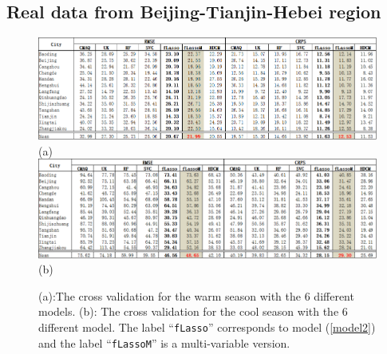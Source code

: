 \documentclass[
12pt, %
a4paper, %
oneside, %
headinclude,footinclude, %
BCOR5mm, %
]{scrartcl}
\begin{document}
\subsection{Real data from Beijing-Tianjin-Hebei region}
  \begin{figure}[H]
    \includegraphics[width= 16cm]{./Figures/fuse_lasso_s}\\
    (a)\\
     \includegraphics[width= 16cm]{./Figures/fuse_lasso_w}\\
     (b)\\
      \caption{(a):The cross validation for the warm season with the $6$ different models. (b): The cross validation for the cool season with the $6$ different model. The label ``\texttt{fLasso}''  corresponds to model (\ref{model2}) and the label ``\texttt{fLassoM}'' is a multi-variable version.}
      \label{fgr:cmaq_obs}
    \end{figure}
%

\end{document}
